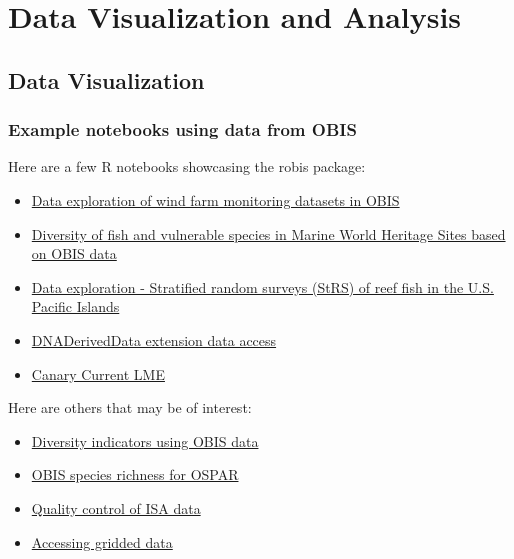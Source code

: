 \documentclass[
  letterpaper,
  DIV=11,
  numbers=noendperiod,
  oneside]{scrreprt}
\providecommand{\tightlist}{%
  \setlength{\itemsep}{0pt}\setlength{\parskip}{0pt}}\usepackage{longtable,booktabs,array}
\begin{document}
\part{Data Visualization and Analysis}

\hypertarget{data-visualization}{%
\chapter{Data Visualization}\label{data-visualization}}

\hypertarget{example-notebooks-using-data-from-obis}{%
\section{Example notebooks using data from
OBIS}\label{example-notebooks-using-data-from-obis}}

Here are a few R notebooks showcasing the robis package:

\begin{itemize}
\tightlist
\item
  \href{https://iobis.github.io/notebook-windfarms/}{Data exploration of
  wind farm monitoring datasets in OBIS}
\item
  \href{https://iobis.github.io/notebook-mwhs/}{Diversity of fish and
  vulnerable species in Marine World Heritage Sites based on OBIS data}
\item
  \href{https://iobis.github.io/notebook-reeffish/}{Data exploration -
  Stratified random surveys (StRS) of reef fish in the U.S. Pacific
  Islands}
\item
  \href{https://iobis.github.io/notebook-dnaderiveddata/}{DNADerivedData
  extension data access}
\item
  \href{https://iobis.github.io/notebook-cclme/}{Canary Current LME}
\end{itemize}

Here are others that may be of interest:

\begin{itemize}
\tightlist
\item
  \href{https://iobis.github.io/notebook-diversity-indicators/}{Diversity
  indicators using OBIS data}
\item
  \href{https://iobis.github.io/notebook-ospar/}{OBIS species richness
  for OSPAR}
\item
  \href{https://iobis.github.io/notebook-deepdata/}{Quality control of
  ISA data}
\item
  \href{https://iobis.github.io/notebook-gridded-data/}{Accessing
  gridded data}
\end{itemize}
\end{document}
